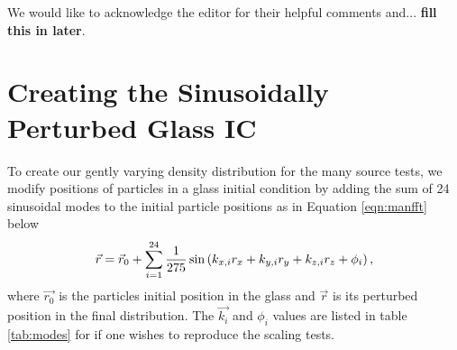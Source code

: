 \documentclass[fleq,usenatbib]{mnras}
\newcommand{\comment}[1]{\textbf{\color{red}#1}}
\begin{document}
We would like to acknowledge the editor for their helpful comments and... 
\comment{fill this in later}.







\appendix
\section{Creating the Sinusoidally Perturbed Glass IC}
\label{sec:icnd}
To create our gently varying density distribution for the many source tests, 
we modify positions of particles in a glass initial condition by adding the 
sum of 24 sinusoidal modes to the initial particle positions as in Equation 
\ref{eqn:manfft} below
\begin{equation}\label{eqn:manfft}
\vec{r} = \vec{r}_{\rm 0} + \sum_{i=1}^{24} \frac{1}{275} \sin 
\left( k_{x,i} r_x + k_{y,i} r_y + k_{z,i} r_z + \phi_i\right),
\end{equation}
where $\vec{r_0}$ is the particles initial position in the glass and $\vec{r}$ 
is its perturbed position in the final distribution. The $\vec{k_i}$ and 
$\phi_i$ values are listed in table \ref{tab:modes} for if one wishes to 
reproduce the scaling tests.  
\end{document}
